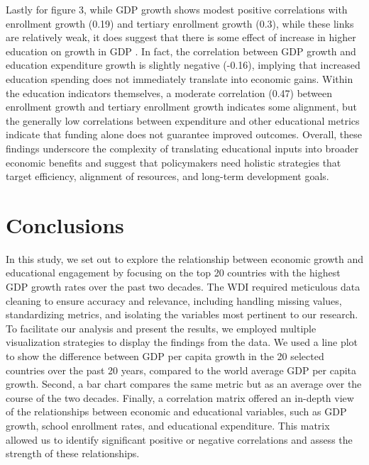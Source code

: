 \documentclass[
  letterpaper,
  DIV=11,
  numbers=noendperiod]{scrartcl}
\begin{document}
Lastly for figure 3, while GDP growth shows modest positive correlations
with enrollment growth (0.19) and tertiary enrollment growth (0.3),
while these links are relatively weak, it does suggest that there is
some effect of increase in higher education on growth in GDP . In fact,
the correlation between GDP growth and education expenditure growth is
slightly negative (-0.16), implying that increased education spending
does not immediately translate into economic gains. Within the education
indicators themselves, a moderate correlation (0.47) between enrollment
growth and tertiary enrollment growth indicates some alignment, but the
generally low correlations between expenditure and other educational
metrics indicate that funding alone does not guarantee improved
outcomes. Overall, these findings underscore the complexity of
translating educational inputs into broader economic benefits and
suggest that policymakers need holistic strategies that target
efficiency, alignment of resources, and long-term development goals.

\section{Conclusions}\label{conclusions}

In this study, we set out to explore the relationship between economic
growth and educational engagement by focusing on the top 20 countries
with the highest GDP growth rates over the past two decades. The WDI
required meticulous data cleaning to ensure accuracy and relevance,
including handling missing values, standardizing metrics, and isolating
the variables most pertinent to our research. To facilitate our analysis
and present the results, we employed multiple visualization strategies
to display the findings from the data. We used a line plot to show the
difference between GDP per capita growth in the 20 selected countries
over the past 20 years, compared to the world average GDP per capita
growth. Second, a bar chart compares the same metric but as an average
over the course of the two decades. Finally, a correlation matrix
offered an in-depth view of the relationships between economic and
educational variables, such as GDP growth, school enrollment rates, and
educational expenditure. This matrix allowed us to identify significant
positive or negative correlations and assess the strength of these
relationships.
\end{document}
